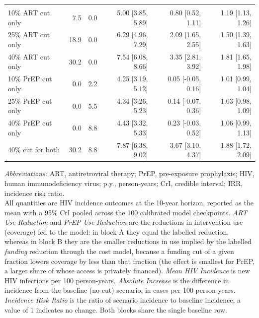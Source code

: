 \begin{landscape}
\begin{table}[!h]
{\begin{tabular}[t]{lrrrrr}
\addlinespace[0.6em]
\multicolumn{6}{l}{\textbf{B. Government funding reduction}}\\
\hspace{1em}10\% ART cut only & 7.5 & 0.0 & \phantom{0}5.00 [3.85, \phantom{0}5.89] & 0.80 [\phantom{-}0.52, 1.11] & 1.19 [1.13, 1.26]\\
\hspace{1em}25\% ART cut only & 18.9 & 0.0 & \phantom{0}6.29 [4.96, \phantom{0}7.29] & 2.09 [\phantom{-}1.65, 2.55] & 1.50 [1.39, 1.63]\\
\hspace{1em}40\% ART cut only & 30.2 & 0.0 & \phantom{0}7.54 [6.08, \phantom{0}8.66] & 3.35 [\phantom{-}2.81, 3.92] & 1.81 [1.65, 1.98]\\
\hspace{1em}10\% PrEP cut only & 0.0 & 2.2 & \phantom{0}4.25 [3.19, \phantom{0}5.12] & 0.05 [-0.05, 0.16] & 1.01 [0.99, 1.04]\\
\hspace{1em}25\% PrEP cut only & 0.0 & 5.5 & \phantom{0}4.34 [3.26, \phantom{0}5.23] & 0.14 [-0.07, 0.36] & 1.03 [0.98, 1.09]\\
\hspace{1em}40\% PrEP cut only & 0.0 & 8.8 & \phantom{0}4.43 [3.32, \phantom{0}5.33] & 0.23 [-0.03, 0.52] & 1.06 [0.99, 1.13]\\
\hspace{1em}40\% cut for both & 30.2 & 8.8 & \phantom{0}7.87 [6.38, \phantom{0}9.02] & 3.67 [\phantom{-}3.10, 4.37] & 1.88 [1.72, 2.09]\\
\bottomrule
\end{tabular}}
\vspace{0.4em}
{\footnotesize\begin{minipage}{\linewidth}
\emph{Abbreviations:} ART, antiretroviral therapy; PrEP, pre-exposure prophylaxis; HIV, human immunodeficiency virus; p.y., person-years; CrI, credible interval; IRR, incidence risk ratio.\\[0.3em]
All quantities are HIV incidence outcomes at the 10-year horizon, reported as the mean with a 95\% CrI pooled across the 100 calibrated model checkpoints. \emph{ART Use Reduction} and \emph{PrEP Use Reduction} are the reductions in intervention use (coverage) fed to the model: in block A they equal the labelled reduction, whereas in block B they are the smaller reductions in use implied by the labelled \emph{funding} reduction through the cost model, because a funding cut of a given fraction lowers coverage by less than that fraction (the effect is smallest for PrEP, a larger share of whose access is privately financed). \emph{Mean HIV Incidence} is new HIV infections per 100 person-years. \emph{Absolute Increase} is the difference in incidence from the baseline (no-cut) scenario, in cases per 100 person-years. \emph{Incidence Risk Ratio} is the ratio of scenario incidence to baseline incidence; a value of 1 indicates no change. Both blocks share the single baseline row.
\end{minipage}}
\end{table}
\end{landscape}
